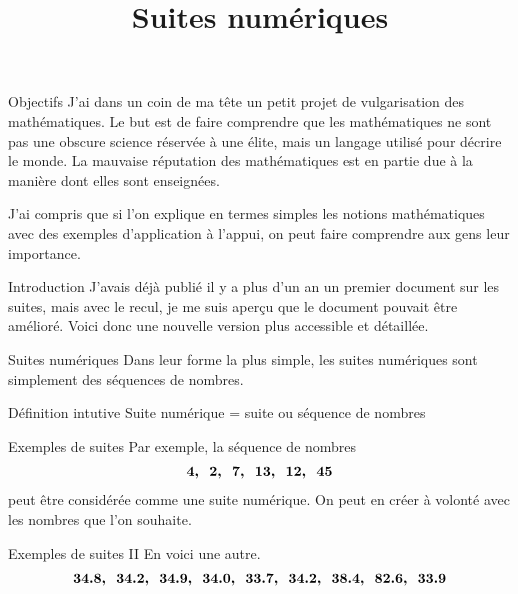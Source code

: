 \documentclass{beamer}
\title{Suites numériques}
\author{}
\begin{document}

\begin{frame}
  \titlepage
\end{frame}

\begin{frame}{Objectifs}
  J'ai dans un coin de ma tête un petit projet de vulgarisation des mathématiques. Le but est de faire comprendre que les mathématiques ne sont pas une obscure science réservée à une élite, mais un langage utilisé pour décrire le monde. La mauvaise réputation des mathématiques est en partie due à la manière dont elles sont enseignées.
  
  J'ai compris que si l'on explique en termes simples les notions mathématiques avec des exemples d'application à l'appui, on peut faire comprendre aux gens leur importance.
\end{frame}

\begin{frame}{Introduction}  
  J'avais déjà publié il y a plus d'un an un premier document sur les suites, mais avec le recul, je me suis aperçu que le document pouvait être amélioré. Voici donc une nouvelle version plus accessible et détaillée.
\end{frame}

\begin{frame}{Suites numériques}
  Dans leur forme la plus simple, les suites numériques sont simplement des séquences de nombres.
  \vspace{12pt}
  \begin{block}{Définition intutive}
    Suite numérique = suite ou séquence de nombres
  \end{block}
\end{frame}

\begin{frame}{Exemples de suites}
  Par exemple, la séquence de nombres
  \begin{align*}
    \footnotesize
    \bm{4,\ \ 2,\ \ 7,\ \ 13,\ \ 12,\ \ 45}
  \end{align*}
  peut être considérée comme une suite numérique. On peut en créer à volonté avec les nombres que l'on souhaite.
\end{frame}

\begin{frame}{Exemples de suites II}
  En voici une autre.
  \begin{align*}
    \footnotesize
    \bm{34.8,\ \ 34.2,\ \ 34.9,\ \ 34.0,\ \ 33.7,\ \ 34.2,\ \ 38.4,\ \ 82.6,\ \ 33.9}
  \end{align*}
\end{frame}
\end{document}
